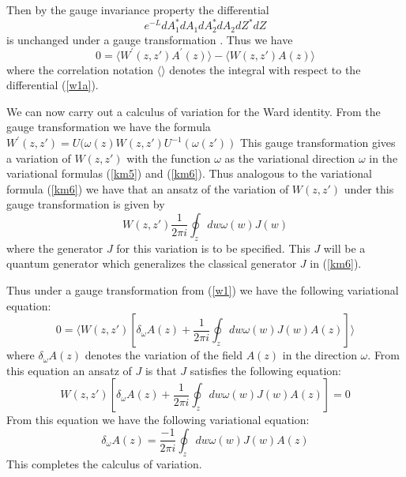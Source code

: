 \documentclass[a4paper,a4paper]{article}
\begin{document}
Then by the gauge invariance property the differential
 \begin{equation}
e^{-L}dA_1^{*}dA_1dA_2^{*}dA_2dZ^{*}dZ
\label{w1a}
\end{equation}
is unchanged under a gauge transformation \cite{Fad}.
Thus  we have 
\begin{equation}
0 = \langle W^{\prime}(z,z')A^{\prime}(z)\rangle -
  \langle W(z,z')A(z)\rangle
\label{w1}
\end{equation}
where the correlation notation 
$\langle \rangle$ denotes the integral with
respect to the differential (\ref{w1a}).


We can now carry out a calculus of variation for the Ward identity.
From the gauge transformation we have the formula 
$W^{\prime}(z,z')=U(\omega(z)W(z,z')U^{-1}(\omega(z'))$
This gauge transformation gives a variation of 
$W(z,z')$ with
the function $\omega$
as the variational direction $\omega$ in the
variational formulas (\ref{km5}) and  (\ref{km6}).
Thus analogous to the variational formula (\ref{km6})
we have that an ansatz of the variation of $W(z,z')$ under 
this gauge transformation is given by
\begin{equation}
W(z,z')
  \frac{1}{2\pi i}\oint_z dw \omega(w)J(w)  
\label{int3}
\end{equation}
where the generator $J$ for this variation is to
be specified. This $J$ will be a quantum generator
which generalizes the classical generator $J$ in
(\ref{km6}).

Thus under a gauge transformation  
from (\ref{w1})
we have the following variational equation:
\begin{equation}
0= \langle W(z,z')[\delta_{\omega}A(z)+\frac{1}{2\pi i}\oint_z dw\omega(w)J(w)A(z)]\rangle
\label{w2}
\end{equation}
where $\delta_{\omega}A(z) $ denotes the variation of the field $A(z)$ in the direction $\omega$.
From this equation an ansatz of $J$ is that $J$
satisfies the following equation:
\begin{equation}
W(z,z')[\delta_{\omega}A(z)+\frac{1}{2\pi i}\oint_z dw\omega(w)J(w)A(z)] =0
\label{n8bb}
\end{equation}
From this equation we have the following variational equation:
\begin{equation}
\delta_{\omega}A(z)=\frac{-1}{2\pi i}\oint_z dw\omega(w)J(w)A(z)
\label{n8b}
\end{equation}
This completes the calculus of variation.
\end{document}
